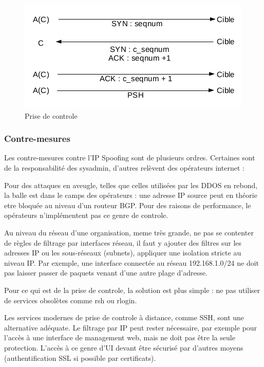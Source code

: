\begin{figure}[hbtp]
\caption{Prise de controle}
\centering
\includegraphics[scale=1]{../images/ip-spoofing-control.png}
\end{figure}

\subsubsection{Contre-mesures}\label{vulnerabilites:reseau:spoofing:ip:countermeasures}

Les contre-mesures contre l'IP Spoofing sont de plusieurs ordres. Certaines sont de la responsabilité des sysadmin, d'autres relèvent des opérateurs internet :


Pour des attaques en aveugle, telles que celles utilisées par les DDOS en rebond, la balle est dans le camps des opérateurs : une adresse IP source peut en théorie etre bloquée au niveau d'un routeur BGP. Pour des raisons de performance, le opérateurs n'implémentent pas ce genre de controle.


Au niveau du réseau d'une organisation, meme très grande, ne pas se contenter de règles de filtrage par interfaces réseau, il faut y ajouter des filtres sur les adresses IP ou les sous-réseaux (subnets), appliquer une isolation stricte au niveau IP. Par exemple, une interface connectée au réseau 192.168.1.0/24 ne doit pas laisser passer de paquets venant d'une autre plage d'adresse.


Pour ce qui est de la prise de controle, la solution est plus simple : ne pas utiliser de services obsolètes comme rsh ou rlogin.

Les services modernes de prise de controle à distance, comme SSH, sont une alternative adéquate. Le filtrage par IP peut rester nécessaire, par exemple pour l'accès à une interface de management web, mais ne doit pas être la seule protection. L'accès à ce genre d'UI devant être sécurisé par d'autres moyens (authentification SSL si possible par certificats).


